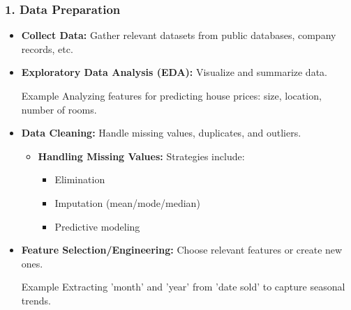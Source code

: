 \documentclass[aspectratio=169]{beamer}
\begin{document}
\begin{frame}[fragile]
    \frametitle{1. Data Preparation}
    \begin{itemize}
        \item \textbf{Collect Data:} Gather relevant datasets from public databases, company records, etc.
        
        \item \textbf{Exploratory Data Analysis (EDA):} Visualize and summarize data.
        \begin{block}{Example}
            Analyzing features for predicting house prices: size, location, number of rooms.
        \end{block}
        
        \item \textbf{Data Cleaning:} Handle missing values, duplicates, and outliers.
        \begin{itemize}
            \item \textbf{Handling Missing Values:} Strategies include:
            \begin{itemize}
                \item Elimination
                \item Imputation (mean/mode/median)
                \item Predictive modeling
            \end{itemize}
        \end{itemize}
        
        \item \textbf{Feature Selection/Engineering:} Choose relevant features or create new ones.
        \begin{block}{Example}
            Extracting 'month' and 'year' from 'date sold' to capture seasonal trends.
        \end{block}
    \end{itemize}
\end{frame}
\end{document}
